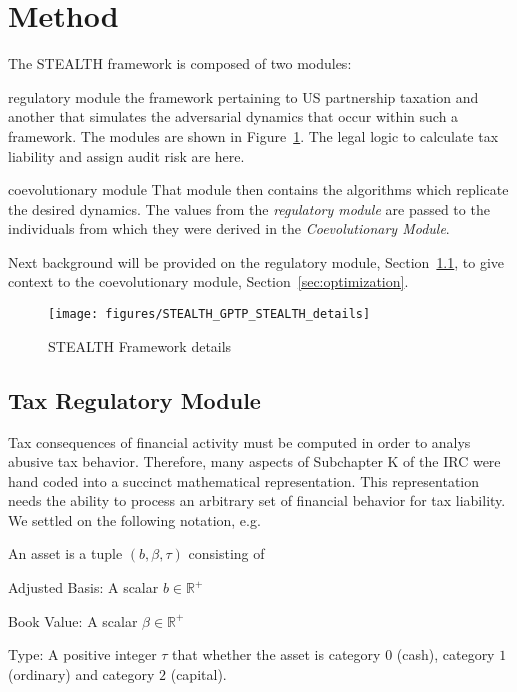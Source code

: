 \section{Method}
\label{sec:method}

The STEALTH framework is composed of two modules:
\begin{inparadesc}
\item [regulatory module] the framework pertaining to US partnership
  taxation and another that simulates the adversarial dynamics that
  occur within such a framework.  The modules are shown in
  Figure~\ref{fig:STEALTH_details}. The legal logic to calculate tax
  liability and assign audit risk are here.
  \item [coevolutionary module] That module then contains the
  algorithms which replicate the desired dynamics. The values from the \textit{regulatory module} are passed to
  the individuals from which they were derived in the
  \textit{Coevolutionary Module}.
\end{inparadesc}
Next background will be provided on the regulatory module,
Section~\ref{sec:regulatorysystem}, to give context to the
coevolutionary module, Section~\ref{sec:optimization}.

\begin{figure}
  \centering
  \texttt{[image: figures/STEALTH\_GPTP\_STEALTH\_details]}
  \caption{STEALTH Framework details}
  \label{fig:STEALTH_details}
\end{figure}

\subsection{Tax Regulatory Module}
\label{sec:regulatorysystem}

Tax consequences of financial activity must be computed in order to
analys abusive tax behavior. Therefore, many aspects of Subchapter K
of the IRC were hand coded into a succinct mathematical
representation. This representation needs the ability to process an
arbitrary set of financial behavior for tax liability. We settled on
the following notation, e.g.

{\small An asset is a tuple $(b, \beta, \tau)$ consisting of
\begin{inparaenum}[\itshape (1)]
  \item Adjusted Basis: A scalar $b \in \mathbb{R}^+$
  \item Book Value: A scalar $\beta \in \mathbb{R}^+$
  \item Type: A positive integer $\tau$ that whether the asset is
    category $0$ (cash), category $1$ (ordinary) and category $2$
    (capital).
\end{inparaenum}}

